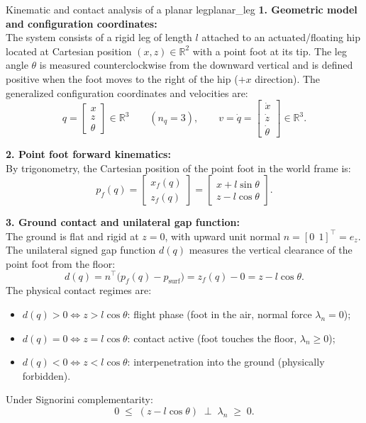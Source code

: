 \documentclass[11pt,a4paper]{article}
\newcommand{\R}{\mathbb{R}}
\begin{document}
\begin{example}{Kinematic and contact analysis of a planar leg}{planar_leg}
\textbf{1. Geometric model and configuration coordinates:}\\
The system consists of a rigid leg of length $l$ attached to an actuated/floating hip located at Cartesian position $(x, z) \in \R^2$ with a point foot at its tip. The leg angle $\theta$ is measured counterclockwise from the downward vertical and is defined positive when the foot moves to the right of the hip ($+x$ direction). The generalized configuration coordinates and velocities are:
\[
  q = \begin{bmatrix} x \\ z \\ \theta \end{bmatrix} \in \R^3 \qquad (n_q = 3), \qquad
  v = \dot q = \begin{bmatrix} \dot x \\ \dot z \\ \dot\theta \end{bmatrix} \in \R^3.
\]

\textbf{2. Point foot forward kinematics:}\\
By trigonometry, the Cartesian position of the point foot in the world frame is:
\begin{equation}\label{eq:leg_foot_pos}
  p_f(q) = \begin{bmatrix} x_f(q) \\ z_f(q) \end{bmatrix} = \begin{bmatrix} x + l\sin\theta \\ z - l\cos\theta \end{bmatrix}.
\end{equation}

\textbf{3. Ground contact and unilateral gap function:}\\
The ground is flat and rigid at $z = 0$, with upward unit normal $n = [0\ \ 1]^\top = e_z$. The unilateral signed gap function $d(q)$ measures the vertical clearance of the point foot from the floor:
\begin{equation}\label{eq:leg_gap}
  d(q) = n^\top\big(p_f(q) - p_{\text{surf}}\big) = z_f(q) - 0 = z - l\cos\theta.
\end{equation}
The physical contact regimes are:
\begin{itemize}[nosep]
  \item $d(q) > 0 \iff z > l\cos\theta$: flight phase (foot in the air, normal force $\lambda_n = 0$);
  \item $d(q) = 0 \iff z = l\cos\theta$: contact active (foot touches the floor, $\lambda_n \ge 0$);
  \item $d(q) < 0 \iff z < l\cos\theta$: interpenetration into the ground (physically forbidden).
\end{itemize}
Under Signorini complementarity:
\begin{equation}
  0 \;\le\; (z - l\cos\theta) \;\perp\; \lambda_n \;\ge\; 0.
\end{equation}


\end{example}
\end{document}

